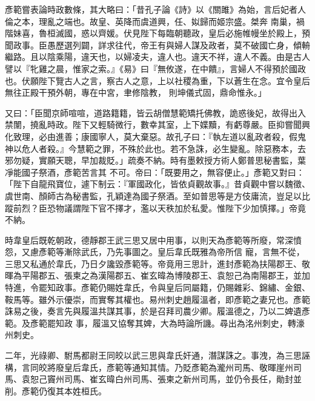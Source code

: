 \begin{pinyinscope}
 彥範嘗表論時政數條，其大略曰：「昔孔子論《詩》以《關雎》為始，言后妃者人倫之本，理亂之端也。故皇、英降而虞道興，任、姒歸而姬宗盛。桀奔
 南巢，禍階妹喜，魯桓滅國，惑以齊媛。伏見陛下每臨朝聽政，皇后必施帷幔坐於殿上，預聞政事。臣愚歷選列闢，詳求往代，帝王有與婦人謀及政者，莫不破國亡身，傾輈繼路。且以陰乘陽，違天也，以婦凌夫，違人也。違天不祥，違人不義。由是古人譬以『牝雞之晨，惟家之索。』《易》曰『無攸遂，在中饋』，言婦人不得預於國政也。伏願陛下覽古人之言，察古人之意，上以社稷為重，下以蒼生在念。宜令皇后無往正殿干預外朝，專在中宮，聿修陰教，
 則坤儀式固，鼎命惟永。」



 又曰：「臣聞京師喧喧，道路籍籍，皆云胡僧慧範矯托佛教，詭惑後妃，故得出入禁闈，撓亂時政。陛下又輕騎微行，數幸其室，上下媟黷，有虧尊嚴。臣抑嘗聞興化致理，必由進善；康國寧人，莫大棄惡。故孔子曰：『執左道以亂政者殺，假鬼神以危人者殺。』今慧範之罪，不殊於此也。若不急誅，必生變亂。除惡務本，去邪勿疑，實願天聰，早加裁貶。」疏奏不納。時有墨敕授方術人鄭普思秘書監，葉凈能國子祭酒，彥範苦言其
 不可。帝曰：「既要用之，無容便止。」彥範又對曰：「陛下自龍飛寶位，遽下制云：『軍國政化，皆依貞觀故事。』昔貞觀中嘗以魏徵、虞世南、顏師古為秘書監，孔穎達為國子祭酒。至如普思等是方伎庸流，豈足以比蹤前烈？臣恐物議謂陛下官不擇才，濫以天秩加於私愛。惟陛下少加慎擇。」帝竟不納。



 時韋皇后既乾朝政，德靜郡王武三思又居中用事，以則天為彥範等所廢，常深憤怨，又慮彥範等漸除武氏，乃先事圖之。皇后韋氏既雅為帝所信
 寵，言無不從，三思又私通於韋氏，乃日夕讒毀彥範等。帝竟用三思計，進封彥範為扶陽郡王、敬暉為平陽郡五、張柬之為漢陽郡五、崔玄暐為博陵郡王、袁恕己為南陽郡王，並加特進，令罷知政事。彥範仍賜姓韋氏，令與皇后同屬籍，仍賜雜彩、錦繡、金銀、鞍馬等。雖外示優崇，而實奪其權也。易州刺史趙履溫者，即彥範之妻兄也。彥範誅易之後，奏言先與履溫共謀其事，於是召拜司農少卿。履溫德之，乃以二婢遺彥範。及彥範罷知政
 事，履溫又協奪其婢，大為時論所譏。尋出為洺州刺史，轉濠州刺史。



 二年，光祿卿、駙馬都尉王同皎以武三思與韋氏奸通，潛謀誅之。事洩，為三思誣構，言同皎將廢皇后韋氏，彥範等通知其情。乃貶彥範為瀧州司馬、敬暉崖州司馬、袁恕己竇州司馬、崔玄暐白州司馬、張柬之新州司馬，並仍令長任，勛封並削。彥範仍復其本姓桓氏。




\end{pinyinscope}
